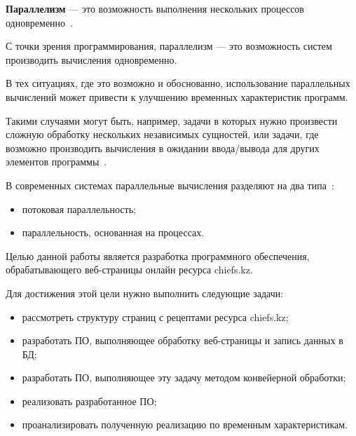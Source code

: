 
\textbf{Параллелизм} --- это возможность выполнения нескольких процессов одновременно~\cite{par-citation}.

С точки зрения программирования, параллелизм --- это возможность систем производить вычисления одновременно.

В тех ситуациях, где это возможно и обоснованно, использование параллельных вычислений может привести к улучшению временных характеристик программ.

Такими случаями могут быть, например, задачи в которых нужно произвести сложную обработку нескольких независимых сущностей, или задачи, где возможно производить вычисления в ожидании ввода/вывода для других элементов программы~\cite{tanenbaum}.

В современных системах параллельные вычисления разделяют на два типа~\cite{tanenbaum}:
\begin{itemize}
  \item потоковая параллельность;
  \item параллельность, основанная на процессах.
\end{itemize}

Целью данной работы является разработка программного обеспечения, обрабатывающего веб-страницы онлайн ресурса chiefs.kz.

Для достижения этой цели нужно выполнить следующие задачи:
\begin{itemize}
  \item рассмотреть структуру страниц с рецептами ресурса chiefs.kz;
  \item разработать ПО, выполняющее обработку веб-страницы и запись данных в БД;
  \item разработать ПО, выполняющее эту задачу методом конвейерной обработки;
  \item реализовать разработанное ПО;
  \item проанализировать полученную реализацию по временным характеристикам.
\end{itemize}

\clearpage